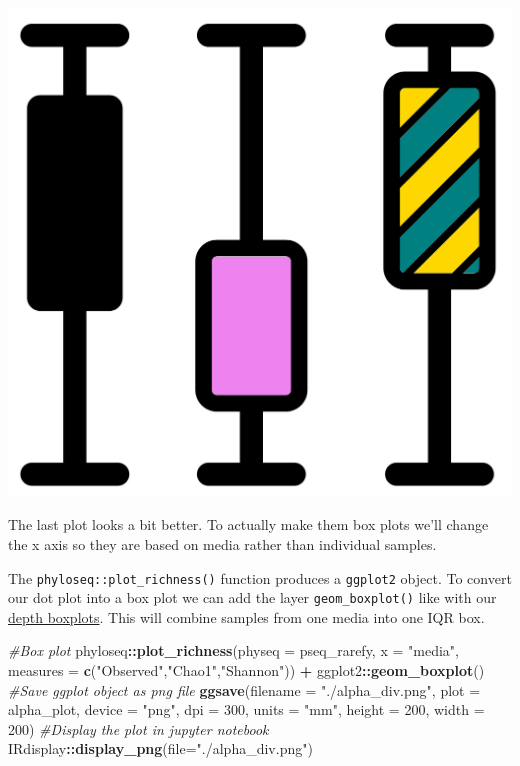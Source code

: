 \documentclass[
]{book}
\newenvironment{Shaded}{\begin{snugshade}}{\end{snugshade}}
\newcommand{\AttributeTok}[1]{\textcolor[rgb]{0.13,0.29,0.53}{#1}}
\newcommand{\CommentTok}[1]{\textcolor[rgb]{0.56,0.35,0.01}{\textit{#1}}}
\newcommand{\DecValTok}[1]{\textcolor[rgb]{0.00,0.00,0.81}{#1}}
\newcommand{\FunctionTok}[1]{\textcolor[rgb]{0.13,0.29,0.53}{\textbf{#1}}}
\newcommand{\NormalTok}[1]{#1}
\newcommand{\SpecialCharTok}[1]{\textcolor[rgb]{0.81,0.36,0.00}{\textbf{#1}}}
\newcommand{\StringTok}[1]{\textcolor[rgb]{0.31,0.60,0.02}{#1}}
\begin{document}
\includegraphics{figures/boxplots_groups.png}

The last plot looks a bit better.
To actually make them box plots we'll change the x axis so they are based on media rather than individual samples.

The \texttt{phyloseq::plot\_richness()} function produces a \texttt{ggplot2} object.
To convert our dot plot into a box plot we can add the layer \texttt{geom\_boxplot()} like with our \protect\hyperlink{depth-boxplots}{depth boxplots}.
This will combine samples from one media into one IQR box.

\begin{Shaded}
\begin{Highlighting}[]
\CommentTok{\#Box plot}
\NormalTok{phyloseq}\SpecialCharTok{::}\FunctionTok{plot\_richness}\NormalTok{(}\AttributeTok{physeq =}\NormalTok{ pseq\_rarefy, }
                        \AttributeTok{x =} \StringTok{"media"}\NormalTok{,}
                        \AttributeTok{measures =} \FunctionTok{c}\NormalTok{(}\StringTok{"Observed"}\NormalTok{,}\StringTok{"Chao1"}\NormalTok{,}\StringTok{"Shannon"}\NormalTok{)) }\SpecialCharTok{+}
\NormalTok{            ggplot2}\SpecialCharTok{::}\FunctionTok{geom\_boxplot}\NormalTok{()}
\CommentTok{\#Save ggplot object as png file}
\FunctionTok{ggsave}\NormalTok{(}\AttributeTok{filename =} \StringTok{"./alpha\_div.png"}\NormalTok{, }\AttributeTok{plot =}\NormalTok{ alpha\_plot,}
       \AttributeTok{device =} \StringTok{"png"}\NormalTok{, }\AttributeTok{dpi =} \DecValTok{300}\NormalTok{, }\AttributeTok{units =} \StringTok{"mm"}\NormalTok{, }\AttributeTok{height =} \DecValTok{200}\NormalTok{, }\AttributeTok{width =} \DecValTok{200}\NormalTok{)}
\CommentTok{\#Display the plot in jupyter notebook}
\NormalTok{IRdisplay}\SpecialCharTok{::}\FunctionTok{display\_png}\NormalTok{(}\AttributeTok{file=}\StringTok{"./alpha\_div.png"}\NormalTok{)}
\end{Highlighting}
\end{Shaded}
\end{document}
